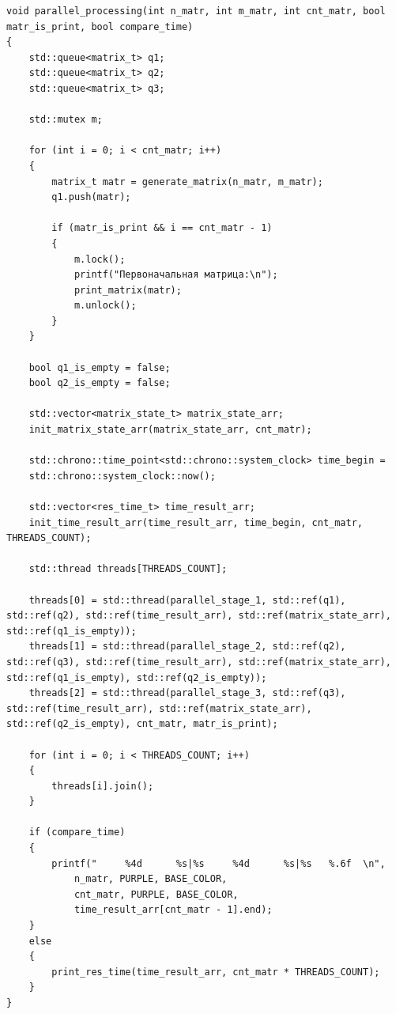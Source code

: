 \documentclass[a4paper,14pt, unknownkeysallowed]{extreport}
\begin{document}
\begin{center}
\captionsetup{justification=raggedright,singlelinecheck=off}
\begin{lstlisting}[label=lst:parallel_processing,caption=Функция алгоритма конвейерной обработки матрицы]
void parallel_processing(int n_matr, int m_matr, int cnt_matr, bool matr_is_print, bool compare_time)
{
	std::queue<matrix_t> q1;
	std::queue<matrix_t> q2;
	std::queue<matrix_t> q3;

	std::mutex m;

	for (int i = 0; i < cnt_matr; i++)
	{
		matrix_t matr = generate_matrix(n_matr, m_matr);
		q1.push(matr);

		if (matr_is_print && i == cnt_matr - 1)
		{
			m.lock();
			printf("Первоначальная матрица:\n");
			print_matrix(matr);
			m.unlock();
		}
	}
	
	bool q1_is_empty = false;
	bool q2_is_empty = false;

	std::vector<matrix_state_t> matrix_state_arr;
	init_matrix_state_arr(matrix_state_arr, cnt_matr);

	std::chrono::time_point<std::chrono::system_clock> time_begin = 
	std::chrono::system_clock::now();

	std::vector<res_time_t> time_result_arr;
	init_time_result_arr(time_result_arr, time_begin, cnt_matr, THREADS_COUNT);

	std::thread threads[THREADS_COUNT];

	threads[0] = std::thread(parallel_stage_1, std::ref(q1), std::ref(q2), std::ref(time_result_arr), std::ref(matrix_state_arr), std::ref(q1_is_empty));
	threads[1] = std::thread(parallel_stage_2, std::ref(q2), std::ref(q3), std::ref(time_result_arr), std::ref(matrix_state_arr), std::ref(q1_is_empty), std::ref(q2_is_empty));
	threads[2] = std::thread(parallel_stage_3, std::ref(q3), std::ref(time_result_arr), std::ref(matrix_state_arr), std::ref(q2_is_empty), cnt_matr, matr_is_print);

	for (int i = 0; i < THREADS_COUNT; i++)
	{
		threads[i].join();
	}

	if (compare_time)
	{
		printf("     %4d      %s|%s     %4d      %s|%s   %.6f  \n",
			n_matr, PURPLE, BASE_COLOR, 
			cnt_matr, PURPLE, BASE_COLOR,
			time_result_arr[cnt_matr - 1].end);
	}
	else
	{
		print_res_time(time_result_arr, cnt_matr * THREADS_COUNT);
	}
}
\end{lstlisting}
\end{center}

\clearpage
\end{document}
